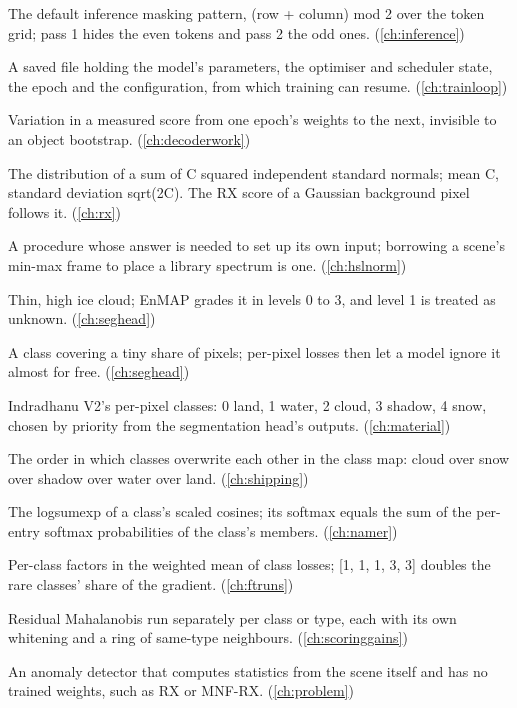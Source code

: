 \begin{description}[style=nextline,leftmargin=1.2em,font=\normalfont\bfseries]
\item[Checkerboard mask] The default inference masking pattern, (row + column) mod 2 over the token grid; pass 1 hides the even tokens and pass 2 the odd ones. (\cref{ch:inference})
\item[Checkpoint] A saved file holding the model's parameters, the optimiser and scheduler state, the epoch and the configuration, from which training can resume. (\cref{ch:trainloop})
\item[Checkpoint noise] Variation in a measured score from one epoch's weights to the next, invisible to an object bootstrap. (\cref{ch:decoderwork})
\item[Chi-square distribution] The distribution of a sum of C squared independent standard normals; mean C, standard deviation sqrt(2C). The RX score of a Gaussian background pixel follows it. (\cref{ch:rx})
\item[Circular procedure] A procedure whose answer is needed to set up its own input; borrowing a scene's min-max frame to place a library spectrum is one. (\cref{ch:hslnorm})
\item[Cirrus] Thin, high ice cloud; EnMAP grades it in levels 0 to 3, and level 1 is treated as unknown. (\cref{ch:seghead})
\item[Class imbalance] A class covering a tiny share of pixels; per-pixel losses then let a model ignore it almost for free. (\cref{ch:seghead})
\item[Class map] Indradhanu V2's per-pixel classes: 0 land, 1 water, 2 cloud, 3 shadow, 4 snow, chosen by priority from the segmentation head's outputs. (\cref{ch:material})
\item[Class priority] The order in which classes overwrite each other in the class map: cloud over snow over shadow over water over land. (\cref{ch:shipping})
\item[Class score] The logsumexp of a class's scaled cosines; its softmax equals the sum of the per-entry softmax probabilities of the class's members. (\cref{ch:namer})
\item[Class weights] Per-class factors in the weighted mean of class losses; [1, 1, 1, 3, 3] doubles the rare classes' share of the gradient. (\cref{ch:ftruns})
\item[Class-aware residual Mahalanobis] Residual Mahalanobis run separately per class or type, each with its own whitening and a ring of same-type neighbours. (\cref{ch:scoringgains})
\item[Classical detector] An anomaly detector that computes statistics from the scene itself and has no trained weights, such as RX or MNF-RX. (\cref{ch:problem})

\end{description}
